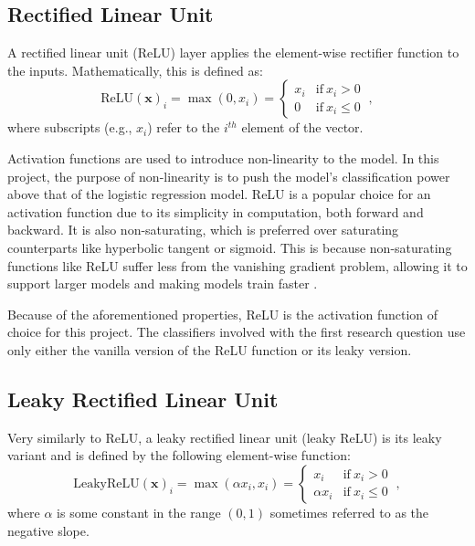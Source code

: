\documentclass{l4proj}
\begin{document}
\subsection{Rectified Linear Unit}
A rectified linear unit (ReLU) layer applies the element-wise rectifier function to the inputs. Mathematically, this is defined as:
\begin{equation}
    \text{ReLU}(\boldsymbol{x})_i = \max(0, x_i) = 
    \begin{cases}
        x_i & \text{if} \ x_i > 0 \\
        0 & \text{if} \ x_i \leq 0
    \end{cases}
    \ ,
\end{equation}
where subscripts (e.g., $x_i$) refer to the $i^{th}$ element of the vector.

Activation functions are used to introduce non-linearity to the model. In this project, the purpose of non-linearity is to push the model's classification power above that of the logistic regression model. ReLU is a popular choice for an activation function due to its simplicity in computation, both forward and backward. It is also non-saturating, which is preferred over saturating counterparts like hyperbolic tangent or sigmoid. This is because non-saturating functions like ReLU suffer less from the vanishing gradient problem, allowing it to support larger models and making models train faster \citep{glorot2011, krizhevsky2017}.

Because of the aforementioned properties, ReLU is the activation function of choice for this project. The classifiers involved with the first research question use only either the vanilla version of the ReLU function or its leaky version.

\subsection{Leaky Rectified Linear Unit} \label{sec:LeakyReLU}
Very similarly to ReLU, a leaky rectified linear unit (leaky ReLU) is its leaky variant and is defined by the following element-wise function:
\begin{equation}
    \text{LeakyReLU}(\boldsymbol{x})_i = \max(\alpha x_i, x_i) = 
    \begin{cases}
        x_i & \text{if} \ x_i > 0 \\
        \alpha x_i & \text{if} \ x_i \leq 0
    \end{cases}
    \ ,
\end{equation}
where $\alpha$ is some constant in the range $(0, 1)$ sometimes referred to as the negative slope.
\end{document}

